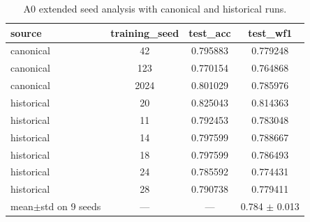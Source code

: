 \begin{table}[t]
\centering
\small
\begin{tabular}{lccc}
\toprule
source & training\_seed & test\_acc & test\_wf1 \\
\midrule
canonical & 42 & 0.795883 & 0.779248 \\
canonical & 123 & 0.770154 & 0.764868 \\
canonical & 2024 & 0.801029 & 0.785976 \\
historical & 20 & 0.825043 & 0.814363 \\
historical & 11 & 0.792453 & 0.783048 \\
historical & 14 & 0.797599 & 0.788667 \\
historical & 18 & 0.797599 & 0.786493 \\
historical & 24 & 0.785592 & 0.774431 \\
historical & 28 & 0.790738 & 0.779411 \\
mean$\pm$std on 9 seeds & --- & --- & 0.784 $\pm$ 0.013 \\
\bottomrule
\end{tabular}
\caption{A0 extended seed analysis with canonical and historical runs.}
\label{tab:supp_a0_extended_seeds}
\end{table}
